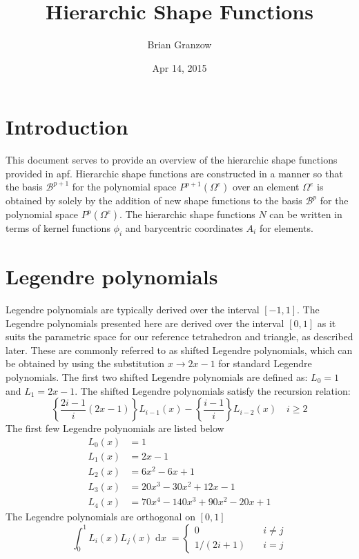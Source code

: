 \documentclass{article}
\title{Hierarchic Shape Functions}
\author{Brian Granzow}
\date{Apr 14, 2015}
\begin{document}
\maketitle

\section{Introduction}

This document serves to provide an overview of the hierarchic shape functions
provided in apf. Hierarchic shape functions are constructed in a manner so that
the basis $\mathcal{B}^{p+1}$ for the polynomial space $P^{p+1}(\Omega^e)$
over an element $\Omega^e$ is obtained by solely by the addition of new shape
functions to the basis $\mathcal{B}^p$ for the polynomial space
$P^p(\Omega^e)$. The hierarchic shape functions $N$ can be written in terms
of kernel functions $\phi_i$ and barycentric coordinates $A_i$ for elements.

\section{Legendre polynomials}

Legendre polynomials are typically derived over the interval $[-1,1]$. The
Legendre polynomials presented here are derived over the interval $[0,1]$
as it suits the parametric space for our reference tetrahedron and triangle,
as described later. These are commonly referred to as shifted Legendre
polynomials, which can be obtained by using the substitution $x \to 2x - 1$ for
standard Legendre polynomials. The first two shifted Legendre polynomials are
defined as: $L_0 = 1$ and $L_1 = 2x - 1$. The shifted Legendre polynomials
satisfy the recursion relation:
\[
\left\{ \frac{2i-1}{i} (2x-1)\right \} L_{i-1}(x) -
\left\{ \frac{i-1}{i} \right \} L_{i-2}(x) \quad i \geq 2
\]
The first few Legendre polynomials are listed below
\begin{align*}
L_0(x) &= 1 \\
L_1(x) &= 2x - 1 \\
L_2(x) &= 6x^2 - 6x + 1 \\
L_3(x) &= 20x^3 - 30x^2 + 12x - 1 \\
L_4(x) & = 70x^4 - 140x^3 + 90x^2 - 20x + 1
\end{align*}
The Legendre polynomials are orthogonal on $[0,1]$
\[
\int _0 ^1 L_i(x) L_j(x) \; \text{d}x \; =
\begin{cases}
0 &\quad i \neq j \\
1/(2i+1) &\quad i = j
\end{cases}
\]
\end{document}
